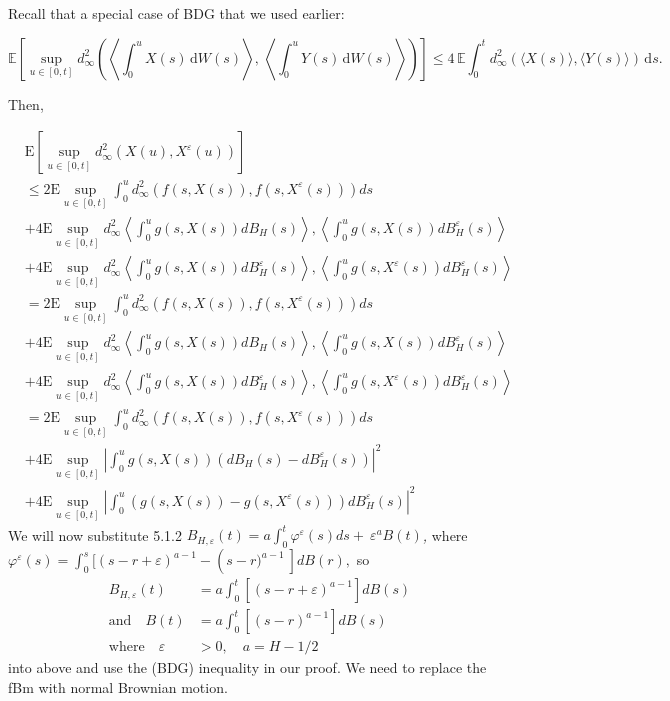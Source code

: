 \documentclass[12pt,a4paper]{report}
\numberwithin{equation}{section}
\begin{document}
Recall that a special case of BDG that we used earlier:

\[
\mathbb{E}\!\left[\sup_{u\in[0,t]}
d_{\infty}^{2}\!\left(
\left\langle\int_{0}^{u} X(s)\,\mathrm{d}W(s)\right\rangle,\,
\left\langle\int_{0}^{u} Y(s)\,\mathrm{d}W(s)\right\rangle
\right)\right]
\le 4\,\mathbb{E}\!\int_{0}^{t}
d_{\infty}^{2}\!\left(\langle X(s)\rangle,\langle Y(s)\rangle\right)\,\mathrm{d}s .
\]

Then,

$$
\begin{aligned}
& \mathrm{E} \left[ \sup_{u \in [0,t]} d_\infty^2 (X(u), X^\varepsilon(u)) \right] \\
& \leq 2 \mathrm{E} \sup_{u \in [0,t]} \int_0^u d_\infty^2 (f(s, X(s)), f(s, X^\varepsilon(s))) ds \\
& + 4 \mathrm{E} \sup_{u \in [0,t]} d_\infty^2 \left\langle \int_0^u g(s, X(s)) dB_H(s) \right\rangle, \left\langle \int_0^u g(s, X(s)) dB_H^\varepsilon(s) \right\rangle \\
& + 4 \mathrm{E} \sup_{u \in [0,t]} d_\infty^2 \left\langle \int_0^u g(s, X(s)) dB_H^\varepsilon(s) \right\rangle, \left\langle \int_0^u g(s, X^\varepsilon(s)) dB_H^\varepsilon(s) \right\rangle \\
& = 2 \mathrm{E} \sup_{u \in [0,t]} \int_0^u d_\infty^2 (f(s, X(s)), f(s, X^\varepsilon(s))) ds \\
& + 4 \mathrm{E} \sup_{u \in [0,t]} d_\infty^2 \left\langle \int_0^u g(s, X(s)) dB_H(s) \right\rangle, \left\langle \int_0^u g(s, X(s)) dB_H^\varepsilon(s) \right\rangle \\
& + 4 \mathrm{E} \sup_{u \in [0,t]} d_\infty^2 \left\langle \int_0^u g(s, X(s)) dB_H^\varepsilon(s) \right\rangle, \left\langle \int_0^u g(s, X^\varepsilon(s)) dB_H^\varepsilon(s) \right\rangle \\
& = 2 \mathrm{E} \sup_{u \in [0,t]} \int_0^u d_\infty^2 (f(s, X(s)), f(s, X^\varepsilon(s))) ds \\
& + 4 \mathrm{E} \sup_{u \in [0,t]} \left| \int_0^u g(s, X(s))(dB_H(s) - dB_H^\varepsilon(s)) \right|^2 \\
& + 4 \mathrm{E} \sup_{u \in [0,t]} \left| \int_0^u (g(s, X(s)) - g(s, X^\varepsilon(s))) dB_H^\varepsilon(s) \right|^2
\end{aligned}
$$
We will now substitute 5.1.2
\(B_{H,\varepsilon}(t) = a\int_{0}^{t}{\varphi^{\varepsilon}(s)ds + \ \varepsilon^{a}B(t)}\)\emph{,}
where
\(\varphi^{\varepsilon}(s) = \int_{0}^{s}{{\lbrack(s - r + \varepsilon)}^{a - 1} - \left( s - r)^{a - 1}\  \right\rbrack dB(r),}\)
so
$$
\begin{aligned}
B_{H,\varepsilon}(t) &= a \int_{0}^{t} \left[ (s - r + \varepsilon)^{a - 1} \right] dB(s) \\
\text{and} \quad B(t) &= a \int_{0}^{t} \left[ (s - r)^{a - 1} \right] dB(s) \\
\text{where} \quad \varepsilon &> 0, \quad a = H - 1/2
\end{aligned}
$$
into above and use the (BDG) inequality in our proof. We need to replace
the fBm with normal Brownian motion. 
\end{document}
